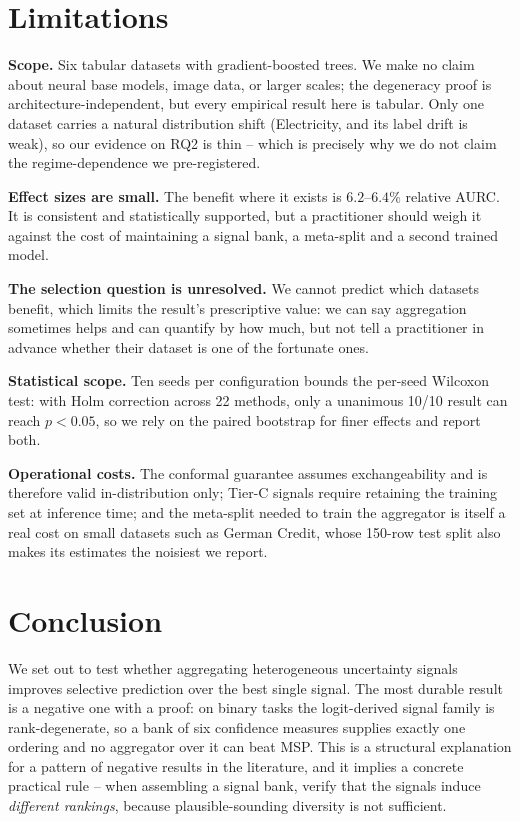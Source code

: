 \documentclass[conference]{IEEEtran}
\begin{document}
\section{Limitations}
\label{sec:limitations}
\textbf{Scope.} Six tabular datasets with gradient-boosted trees. We
make no claim about neural base models, image data, or larger scales; the
degeneracy proof is architecture-independent, but every empirical result
here is tabular. Only one dataset carries a natural distribution shift
(Electricity, and its label drift is weak), so our evidence on RQ2 is thin
-- which is precisely why we do not claim the regime-dependence we
pre-registered.

\textbf{Effect sizes are small.} The benefit where it exists is
$6.2$--$6.4\%$ relative AURC. It is consistent and statistically
supported, but a practitioner should weigh it against the cost of
maintaining a signal bank, a meta-split and a second trained model.

\textbf{The selection question is unresolved.} We cannot predict which
datasets benefit, which limits the result's prescriptive value: we can say
aggregation sometimes helps and can quantify by how much, but not tell a
practitioner in advance whether their dataset is one of the fortunate
ones.

\textbf{Statistical scope.} Ten seeds per configuration bounds the
per-seed Wilcoxon test: with Holm correction across 22 methods, only a
unanimous 10/10 result can reach $p<0.05$, so we rely on the paired
bootstrap for finer effects and report both.

\textbf{Operational costs.} The conformal guarantee assumes
exchangeability and is therefore valid in-distribution only; Tier-C
signals require retaining the training set at inference time; and the
meta-split needed to train the aggregator is itself a real cost on small
datasets such as German Credit, whose 150-row test split also makes its
estimates the noisiest we report.

\section{Conclusion}
\label{sec:conclusion}
We set out to test whether aggregating heterogeneous uncertainty signals
improves selective prediction over the best single signal. The most
durable result is a negative one with a proof: on binary tasks the
logit-derived signal family is rank-degenerate, so a bank of six
confidence measures supplies exactly one ordering and no aggregator over
it can beat MSP. This is a structural explanation for a pattern of
negative results in the literature, and it implies a concrete practical
rule -- when assembling a signal bank, verify that the signals induce
\emph{different rankings}, because plausible-sounding diversity is not
sufficient.
\end{document}

